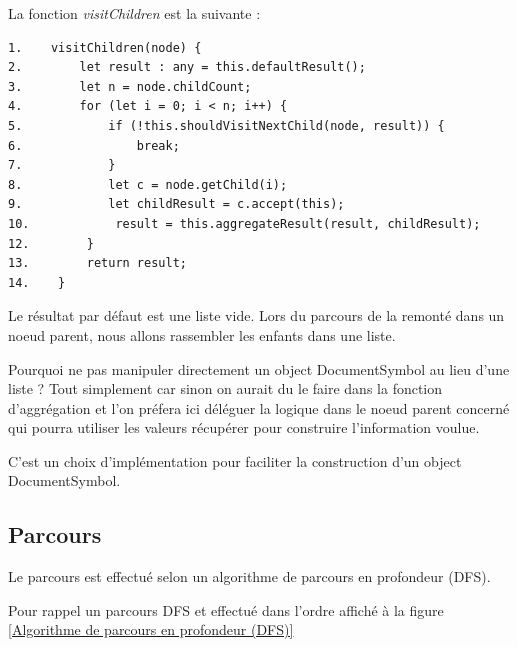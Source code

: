 \documentclass[
    iict, %
    il, %
]{heig-tb}
\begin{document}
La fonction \emph{visitChildren} est la suivante :

\begin{lstlisting}
1.    visitChildren(node) {
2.        let result : any = this.defaultResult();
3.        let n = node.childCount;
4.        for (let i = 0; i < n; i++) {
5.            if (!this.shouldVisitNextChild(node, result)) {
6.                break;
7.            }
8.            let c = node.getChild(i);
9.            let childResult = c.accept(this);
10.            result = this.aggregateResult(result, childResult);
12.        }
13.        return result;
14.    }
\end{lstlisting}

Le résultat par défaut est une liste vide. Lors du parcours de la remonté dans un noeud parent, nous allons rassembler les enfants dans une liste.

Pourquoi ne pas manipuler directement un object DocumentSymbol au lieu d'une liste ?
Tout simplement car sinon on aurait du le faire dans la fonction d'aggrégation et l'on préfera ici déléguer la logique dans le noeud parent concerné
qui pourra utiliser les valeurs récupérer pour construire l'information voulue.

C'est un choix d'implémentation pour faciliter la construction d'un object DocumentSymbol.

\subsection{Parcours}
Le parcours est effectué selon un algorithme de parcours en profondeur (DFS).







Pour rappel un parcours DFS et effectué dans l'ordre affiché à la figure \ref*{Algorithme de parcours en profondeur (DFS)}
\end{document}
